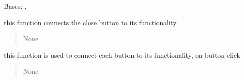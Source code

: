 \documentclass[letterpaper,10pt,english]{sphinxmanual}
\begin{document}
\begin{savenotes}\begin{fulllineitems}
\label{\detokenize{setting/confirm_UI:oxin.confirm_UI.UI_main_window}}
\pysigstartsignatures
{}
\pysigstopsignatures
\sphinxAtStartPar
Bases: , 

\begin{savenotes}\begin{fulllineitems}
\label{\detokenize{setting/confirm_UI:oxin.confirm_UI.UI_main_window.activate_}}
\pysigstartsignatures
{}
\pysigstopsignatures
\sphinxAtStartPar
this function connects the close button to its functionality
\begin{quote}\begin{description}
\sphinxAtStartPar
None

\end{description}\end{quote}

\end{fulllineitems}\end{savenotes}


\begin{savenotes}\begin{fulllineitems}
\label{\detokenize{setting/confirm_UI:oxin.confirm_UI.UI_main_window.buttonClick}}
\pysigstartsignatures
{}
\pysigstopsignatures
\sphinxAtStartPar
this function is used to connect each button to its functionality, on button click
\begin{quote}\begin{description}
\sphinxAtStartPar
None

\end{description}\end{quote}


\end{fulllineitems}
\end{savenotes}
\end{fulllineitems}
\end{savenotes}
\end{document}
